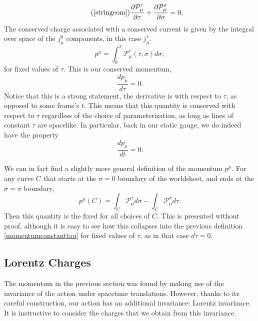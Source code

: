 \documentclass[a4paper,12pt]{article}
\numberwithin{equation}{section}
\begin{document}
\begin{equation}\tag{\ref{stringeom}}
\frac{\partial \mathcal{P}_\mu^\tau}{\partial \tau} + \frac{\partial \mathcal{P}_\mu^\sigma}{\partial \sigma} = 0,
\end{equation}
The conserved charge associated with a conserved current is given by the integral over space of the $j_\mu^0$ components, in this case $j_\mu^\tau$.
\begin{equation}\label{momentumconstanttau}
p^\mu = \int_0^\pi\mathcal{P}_\mu^\tau(\tau, \sigma)d\sigma,
\end{equation}
for fixed values of $\tau$. This is our conserved momentum, 
\begin{equation}
\frac{dp_\mu}{d\tau} = 0.
\end{equation}
Notice that this is a strong statement, the derivative is with respect to $\tau$, as opposed to some frame's $t$. This means that this quantity is conserved with respect to $\tau$ regardless of the choice of parameterization, as long as lines of constant $\tau$ are spacelike. In particular, back in our static gauge, we do indeed have the property 
\begin{equation}
\frac{dp_\mu}{dt} = 0.
\end{equation}

We can in fact find a slightly more general definition of the momentum $p^\mu$. For any curve $C$ that starts at the $\sigma = 0$ boundary of the worldsheet, and ends at the $\sigma = \pi$ boundary, 
\begin{equation}\label{generalmomentum}
p^\mu(C) = \int_C \mathcal{P}_\mu^\tau d\sigma - \int_C \mathcal{P}_\mu^\sigma d\tau.
\end{equation}
Then this quantity is the fixed for all choices of $C$. This is presented without proof, although it is easy to see how this collapses into the previous definition \ref{momentumconstanttau} for fixed values of $\tau$, as in that case $d\tau = 0$.
\subsection{Lorentz Charges}\label{lorentzcharges}
The momentum in the previous section was found by making use of the invariance of the action under spacetime translations. However, thanks to its careful construction, our action has an additional invariance: Lorentz invariance. It is instructive to consider the charges that we obtain from this invariance.
\end{document}
